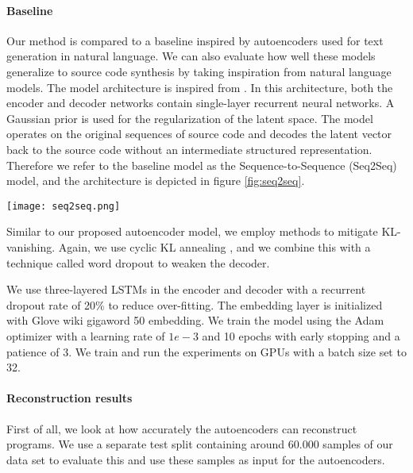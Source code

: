 \paragraph{Baseline}
Our method is compared to a baseline inspired by autoencoders used for text generation in natural language. We can also evaluate how well these models generalize to source code synthesis by taking inspiration from natural language models. The model architecture is inspired from \cite{bowman2015generating}. In this architecture, both the encoder and decoder networks contain single-layer recurrent neural networks. A Gaussian prior is used for the regularization of the latent space. The model operates on the original sequences of source code and decodes the latent vector back to the source code without an intermediate structured representation. Therefore we refer to the baseline model as the Sequence-to-Sequence (Seq2Seq) model, and the architecture is depicted in figure \ref{fig:seq2seq}.

\begin{figure*}[ht!]
    \centering
    \texttt{[image: seq2seq.png]}
    \caption{The architecture of the Seq2Seq model}
    \label{fig:seq2seq}
\end{figure*}

Similar to our proposed autoencoder model, we employ methods to mitigate KL-vanishing. Again, we use cyclic KL annealing \cite{fu2019cyclical}, and we combine this with a technique called word dropout \cite{bowman2015generating} to weaken the decoder.

We use three-layered LSTMs in the encoder and decoder with a recurrent dropout rate of 20\% to reduce over-fitting. The embedding layer is initialized with Glove wiki gigaword 50 \cite{pennington2014glove} embedding. We train the model using the Adam optimizer \cite{kingma2014adam} with a learning rate of $1e-3$ and 10 epochs with early stopping and a patience of 3. We train and run the experiments on GPUs with a batch size set to 32.

\paragraph{Reconstruction results}\label{sec:recon-results}
First of all, we look at how accurately the autoencoders can reconstruct programs. We use a separate test split containing around 60.000 samples of our data set to evaluate this and use these samples as input for the autoencoders. 



